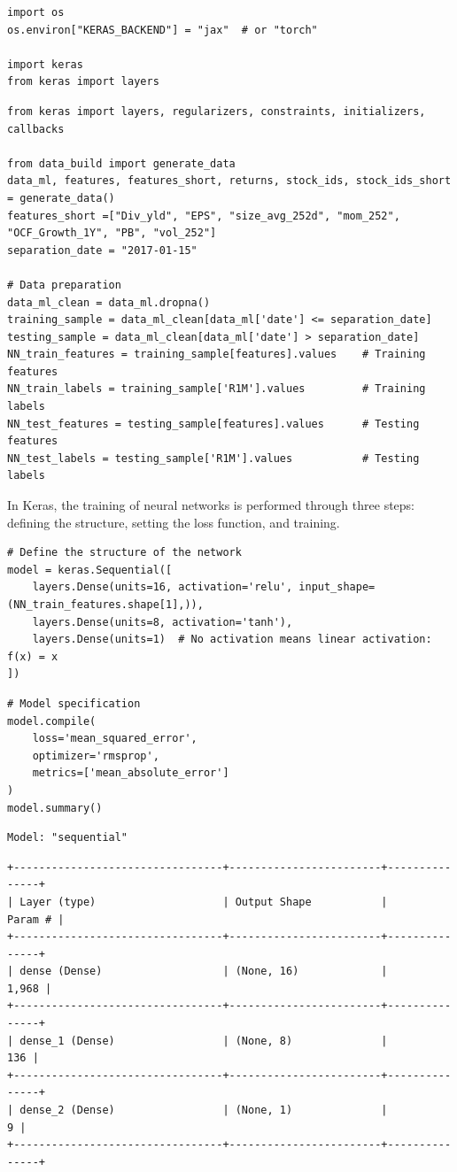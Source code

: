 \begin{verbatim}
import os
os.environ["KERAS_BACKEND"] = "jax"  # or "torch"

import keras
from keras import layers
\end{verbatim}

\begin{verbatim}
from keras import layers, regularizers, constraints, initializers, callbacks

from data_build import generate_data
data_ml, features, features_short, returns, stock_ids, stock_ids_short = generate_data()
features_short =["Div_yld", "EPS", "size_avg_252d", "mom_252", "OCF_Growth_1Y", "PB", "vol_252"]
separation_date = "2017-01-15"

# Data preparation
data_ml_clean = data_ml.dropna()
training_sample = data_ml_clean[data_ml['date'] <= separation_date]
testing_sample = data_ml_clean[data_ml['date'] > separation_date] 
NN_train_features = training_sample[features].values    # Training features
NN_train_labels = training_sample['R1M'].values         # Training labels
NN_test_features = testing_sample[features].values      # Testing features
NN_test_labels = testing_sample['R1M'].values           # Testing labels
\end{verbatim}

In Keras, the training of neural networks is performed through three steps: defining the structure, setting the loss function, and training.

\begin{verbatim}
# Define the structure of the network
model = keras.Sequential([
    layers.Dense(units=16, activation='relu', input_shape=(NN_train_features.shape[1],)),
    layers.Dense(units=8, activation='tanh'),
    layers.Dense(units=1)  # No activation means linear activation: f(x) = x
])
\end{verbatim}

\begin{verbatim}
# Model specification
model.compile(
    loss='mean_squared_error',
    optimizer='rmsprop',
    metrics=['mean_absolute_error']
)
model.summary()
\end{verbatim}

\begin{verbatim}
Model: "sequential"
\end{verbatim}

\begin{verbatim}
+---------------------------------+------------------------+---------------+
| Layer (type)                    | Output Shape           |       Param # |
+---------------------------------+------------------------+---------------+
| dense (Dense)                   | (None, 16)             |         1,968 |
+---------------------------------+------------------------+---------------+
| dense_1 (Dense)                 | (None, 8)              |           136 |
+---------------------------------+------------------------+---------------+
| dense_2 (Dense)                 | (None, 1)              |             9 |
+---------------------------------+------------------------+---------------+
\end{verbatim}

